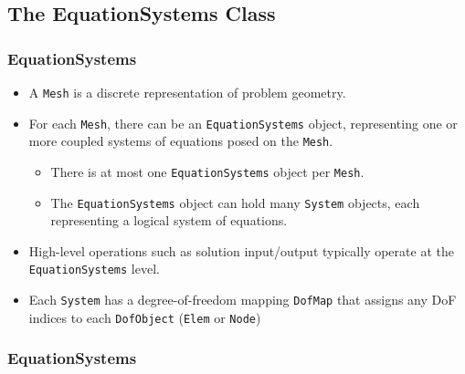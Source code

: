 \subsection{The EquationSystems Class}
\begin{frame}
  \frametitle{EquationSystems}
  \begin{block}{}
    \begin{itemize}
      \item A \texttt{Mesh} is a discrete representation of problem geometry.
      \item For each \texttt{Mesh}, there can be an
        \texttt{EquationSystems} object, representing one or more
        coupled systems of equations posed on the \texttt{Mesh}.
        \begin{itemize}
          \item There is at most one \texttt{EquationSystems} object per \texttt{Mesh}.
          \item The \texttt{EquationSystems} object can hold many \texttt{System} objects, each representing a logical system of equations.
        \end{itemize}
      \item High-level operations such as solution input/output
        typically operate at the \texttt{EquationSystems} level.
      \item Each \texttt{System} has a degree-of-freedom mapping
        \texttt{DofMap} that assigns any DoF indices to each
        \texttt{DofObject} (\texttt{Elem} or \texttt{Node})
    \end{itemize}
  \end{block}
\end{frame}

\begin{frame}[shrink]
  \frametitle{EquationSystems}
  
\end{frame}




